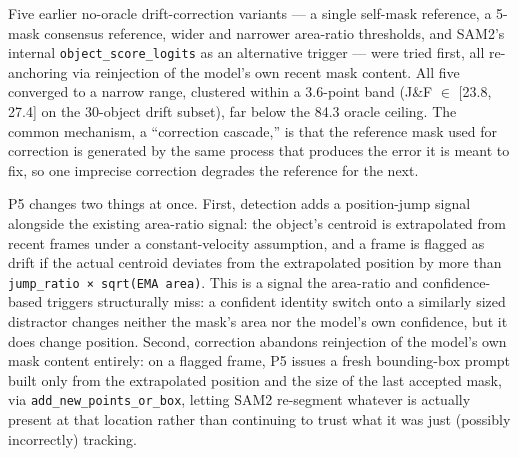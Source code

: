 \documentclass[11pt]{article}
\begin{document}
Five earlier no-oracle drift-correction variants — a single self-mask reference, a 5-mask consensus reference, wider and narrower area-ratio thresholds, and SAM2's internal \texttt{object\_score\_logits} as an alternative trigger — were tried first, all re-anchoring via reinjection of the model's own recent mask content. All five converged to a narrow range, clustered within a 3.6-point band (J\&F $\in$ [23.8, 27.4] on the 30-object drift subset), far below the 84.3 oracle ceiling. The common mechanism, a ``correction cascade,'' is that the reference mask used for correction is generated by the same process that produces the error it is meant to fix, so one imprecise correction degrades the reference for the next.

P5 changes two things at once. First, detection adds a position-jump signal alongside the existing area-ratio signal: the object's centroid is extrapolated from recent frames under a constant-velocity assumption, and a frame is flagged as drift if the actual centroid deviates from the extrapolated position by more than \texttt{jump\_ratio × sqrt(EMA area)}. This is a signal the area-ratio and confidence-based triggers structurally miss: a confident identity switch onto a similarly sized distractor changes neither the mask's area nor the model's own confidence, but it does change position. Second, correction abandons reinjection of the model's own mask content entirely: on a flagged frame, P5 issues a fresh bounding-box prompt built only from the extrapolated position and the size of the last accepted mask, via \texttt{add\_new\_points\_or\_box}, letting SAM2 re-segment whatever is actually present at that location rather than continuing to trust what it was just (possibly incorrectly) tracking.
\end{document}
